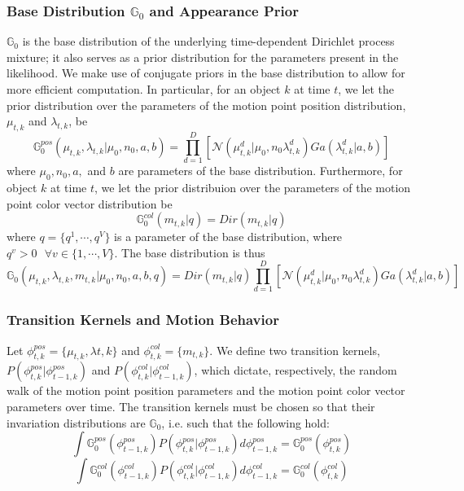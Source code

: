\documentclass{article}
\begin{document}
\subsubsection{Base Distribution $\mathbb{G}_{0}$ and Appearance Prior}
$\mathbb{G}_{0}$ is the base distribution of the underlying time-dependent Dirichlet process mixture; it also serves as a prior distribution for the parameters present in the likelihood. We make use of conjugate priors in the base distribution to allow for more efficient computation. In particular, for an object $k$ at time $t$, we let the prior distribution over the parameters of the motion point position distribution, $\mu_{t, k}$ and $\lambda_{t, k}$, be 
\begin{equation}
\mathbb{G}_{0}^{pos}(\mu_{t, k}, \lambda_{t, k} | \mu_{0}, n_{0}, a, b) = \prod_{d=1}^{D}[\mathcal{N}(\mu_{t, k}^{d} | \mu_{0}, n_{0} \lambda_{t, k}^{d})   Ga(\lambda_{t, k}^{d} | a, b)]
\end{equation}
where $\mu_{0}, n_{0}, a,$ and $b$ are parameters of the base distribution. Furthermore, for object $k$ at time $t$, we let the prior distribuion over the parameters of the motion point color vector distribution be
\begin{equation}
\mathbb{G}_{0}^{col}(m_{t, k} | q) = Dir(m_{t, k} | q)
\end{equation}
where $q = \{ q^{1}, \cdots, q^{V} \}$ is a parameter of the base distribution, where $q^{v}>0 \hspace{8pt} \forall v \in \{ 1, \cdots, V \}$. The base distribution is thus 
\begin{equation}
\mathbb{G}_{0}(\mu_{t, k}, \lambda_{t, k}, m_{t, k} | \mu_{0}, n_{0}, a, b, q) = Dir(m_{t, k} | q)  \prod_{d=1}^{D}[\mathcal{N}(\mu_{t, k}^{d} | \mu_{0}, n_{0} \lambda_{t, k}^{d})   Ga(\lambda_{t, k}^{d} | a, b)]
\end{equation}


\subsubsection*{Transition Kernels and Motion Behavior}
Let $\phi_{t,k}^{pos} = \{ \mu_{t, k}, \lambda{t, k} \}$ and $\phi_{t,k}^{col} = \{ m_{t, k} \}$.  We define two transition kernels, $P(\phi_{t, k}^{pos} | \phi_{t-1, k}^{pos})$ and $P(\phi_{t, k}^{col} | \phi_{t-1, k}^{col})$, which dictate, respectively, the random walk of the motion point position parameters and the motion point color vector parameters over time. The transition kernels must be chosen so that their invariation distributions are $\mathbb{G}_{0}$, i.e. such that the following hold:
\begin{equation}
\int \mathbb{G}_{0}^{pos}(\phi_{t-1, k}^{pos}) P(\phi_{t, k}^{pos} | \phi_{t-1, k}^{pos}) d\phi_{t-1, k}^{pos}  =  \mathbb{G}_{0}^{pos}(\phi_{t, k}^{pos})
\end{equation}
\begin{equation}
\int \mathbb{G}_{0}^{col}(\phi_{t-1, k}^{col}) P(\phi_{t, k}^{col} | \phi_{t-1, k}^{col}) d\phi_{t-1, k}^{col}  =  \mathbb{G}_{0}^{col}(\phi_{t, k}^{col})
\end{equation}
\end{document}
